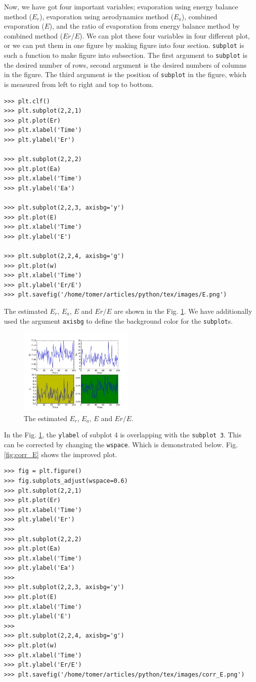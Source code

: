 \documentclass[10pt]{book}
\begin{document}
{
Now, we have got four important variables; evaporation using energy balance method ($E_r$), evaporation using aerodynamics method ($E_a$), combined evaporation ($E$), and the ratio of evaporation from energy balance method by combined method ($Er/E$). We can plot these four variables in four different plot, or we can put them in one figure by making figure into four section. \verb"subplot" is such a function to make figure into subsection. The first argument to \verb"subplot" is the desired number of rows, second argument is the desired numbers of columns in the figure. The third argument is the position of \verb"subplot" in the figure, which is measured from left to right and top to bottom. 
\beforeverb \begin{verbatim}
>>> plt.clf()
>>> plt.subplot(2,2,1)
>>> plt.plot(Er)
>>> plt.xlabel('Time')
>>> plt.ylabel('Er')

>>> plt.subplot(2,2,2)
>>> plt.plot(Ea)
>>> plt.xlabel('Time')
>>> plt.ylabel('Ea')

>>> plt.subplot(2,2,3, axisbg='y')
>>> plt.plot(E)
>>> plt.xlabel('Time')
>>> plt.ylabel('E')

>>> plt.subplot(2,2,4, axisbg='g')
>>> plt.plot(w)
>>> plt.xlabel('Time')
>>> plt.ylabel('Er/E')
>>> plt.savefig('/home/tomer/articles/python/tex/images/E.png')
\end{verbatim} \afterverb

The estimated $E_r$, $E_a$, $E$ and $Er/E$ are shown in the Fig. \ref{fig:E}. We have additionally used the argument \verb"axisbg" to define the background color for the \verb"subplot"s. 
\beforefig
\begin{figure}[h!]
  \centering
    \includegraphics[width=0.5\textwidth]{images/E.png}
  \caption{The estimated $E_r$, $E_a$, $E$ and $Er/E$.}
   \label{fig:E}
\end{figure}
\afterfig

In the Fig. \ref{fig:E}, the \verb"ylabel" of subplot 4 is overlapping with the \verb"subplot 3". This can be corrected by changing the \verb"wspace". Which is demonstrated below. Fig. \ref{fig:corr_E} shows the improved plot.
\beforeverb
\begin{verbatim}
>>> fig = plt.figure()
>>> fig.subplots_adjust(wspace=0.6)
>>> plt.subplot(2,2,1)
>>> plt.plot(Er)
>>> plt.xlabel('Time')
>>> plt.ylabel('Er')
>>> 
>>> plt.subplot(2,2,2)
>>> plt.plot(Ea)
>>> plt.xlabel('Time')
>>> plt.ylabel('Ea')
>>> 
>>> plt.subplot(2,2,3, axisbg='y')
>>> plt.plot(E)
>>> plt.xlabel('Time')
>>> plt.ylabel('E')
>>> 
>>> plt.subplot(2,2,4, axisbg='g')
>>> plt.plot(w)
>>> plt.xlabel('Time')
>>> plt.ylabel('Er/E')
>>> plt.savefig('/home/tomer/articles/python/tex/images/corr_E.png')
\end{verbatim}
\afterverb

}
\end{document}
